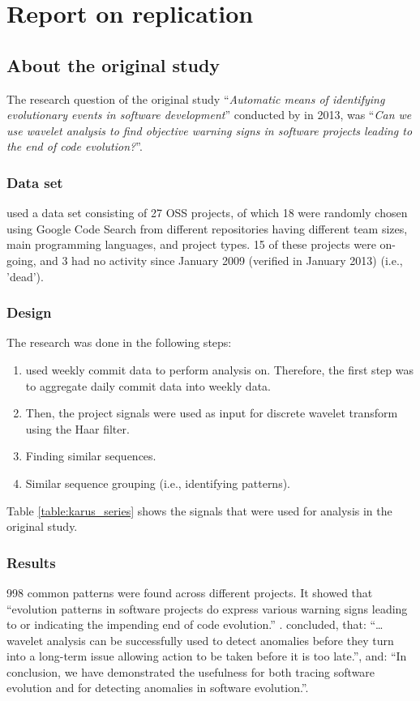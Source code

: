 \chapter{Report on replication}
\label{replication}

\section{About the original study}
The research question of the original study ``\emph{Automatic means of
identifying evolutionary events in software development}\rm'' conducted by
\citet{karus2013} in 2013, was ``\emph{Can we use wavelet analysis to find
objective warning signs in software projects leading to the end of code
evolution?}\rm''.

\subsection{Data set}
\citeauthor{karus2013} used a data set consisting of 27 OSS projects, of which
18 were randomly chosen using Google Code Search from different repositories
having different team sizes, main programming languages, and project types. 15
of these projects were on-going, and 3 had no activity since January 2009
(verified in January 2013) (i.e., 'dead').

\subsection{Design}
The research was done in the following steps:
\begin{enumerate}
	\item \citeauthor{karus2013} used weekly commit data to perform analysis on.
		Therefore, the first step was to aggregate daily commit data into weekly data.
	\item Then, the project signals were used as input for discrete wavelet
		transform using the Haar filter.
	\item Finding similar sequences.
	\item Similar sequence grouping (i.e., identifying patterns).
\end{enumerate}

\noindent
Table \ref{table:karus_series} shows the signals that were used for analysis in
the original study.



\subsection{Results}
998 common patterns were found across different projects. It showed that
``evolution patterns in software projects do express various warning signs
leading to or indicating the impending end of code evolution.''
\cite{karus2013}.
\citeauthor{karus2013} concluded, that: ``\ldots wavelet analysis can be
successfully used to detect anomalies before they turn into a long-term issue
allowing action to be taken before it is too late.'', and: ``In conclusion, we
have demonstrated the usefulness for both tracing software evolution and for
detecting anomalies in software evolution.''.

